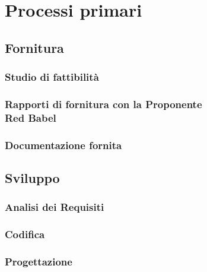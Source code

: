 \documentclass[main.tex]{subfiles}
\begin{document}
\chapter{Processi primari}

\section{Fornitura}
\subsection{Studio di fattibilità}
\subsection{Rapporti di fornitura con la Proponente\\ Red Babel}
\subsection{Documentazione fornita}

\section{Sviluppo}
\subsection{Analisi dei Requisiti}
\subsection{Codifica}
\subsection{Progettazione}
\end{document}
